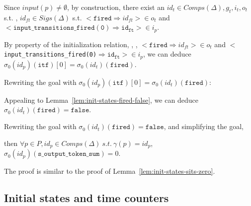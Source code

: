 \documentclass[dvipsnames,12pt]{article}
\begin{document}
\begin{niproof}
\begin{enumerate}
\begin{itemize}
    Since $input(p)\neq\emptyset$, by construction, there exist an
    $id_t\in{}Comps(\Delta),g_t,i_t,o_t$ s.t. \InCsCompT{},
    $id_{ft}\in{}Sigs(\Delta)$ s.t.
    ${<}\mathtt{fired\Rightarrow}id_{ft}{>}\in{}o_t$ and\\
    ${<}\mathtt{input\_transitions\_fired(0)\Rightarrow{}id_{ft}}{>}\in{}i_p$.

    By property of the initialization relation, \InCsCompP{},
    \InCsCompT{}, ${<}\mathtt{fired\Rightarrow}id_{ft}{>}\in{}o_t$
    and
    ${<}$\texttt{input\_transitions\_fired(0)}$\Rightarrow{}\mathtt{id_{ft}}{>}\in{}i_p$,
    we can deduce $\sigma_0(id_p)(\texttt{itf})[0]=\sigma_0(id_t)(\texttt{fired})$.

    Rewriting the goal with $\sigma_0(id_p)(\texttt{itf})[0]=\sigma_0(id_t)(\texttt{fired})$:\\

    Appealing to Lemma~\ref{lem:init-states-fired-false}, we can
    deduce $\sigma_0(id_t)(\texttt{fired})=\mathtt{false}$.

    Rewriting the goal with $\sigma_0(id_t)(\texttt{fired})=\mathtt{false}$,
    and simplifying the goal, 
  \end{itemize}
\end{enumerate}
  
\end{niproof}

\begin{lemma}
  \label{lem:init-states-sots-zero}
  \inithyps{} then
  $\forall{}p\in{}P,id_p\in{}Comps(\Delta)~s.t.~\gamma(p)=id_p$,
  $\sigma_0(id_p)(\texttt{s\_output\_token\_sum})=0$.
\end{lemma}

\begin{niproof}
  The proof is similar to the proof of
  Lemma~\ref{lem:init-states-sits-zero}.
\end{niproof}

\subsection{Initial states and time counters}
\label{sec:init-states-tc}
\end{document}
